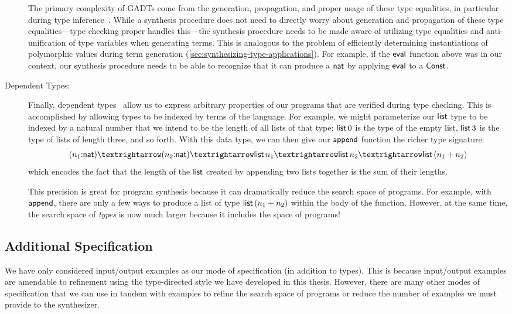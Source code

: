\begin{description}
    The primary complexity of GADTs come from the generation, propagation, and proper usage of these type equalities, in particular during type inference~\citep{peyton-jones-icfp-2006}.
    While a synthesis procedure does not need to directly worry about generation and propagation of these type equalities---type checking proper handles this---the synthesis procedure needs to be made aware of utilizing type equalities and anti-unification of type variables when generating terms.
    This is analogous to the problem of efficiently determining instantiations of polymorphic values during term generation (\autoref{sec:synthesizing-type-applications}).
    For example, if the $\mathsf{eval}$ function above was in our context, our synthesis procedure needs to be able to recognize that it can produce a $\mathsf{nat}$ by applying $\mathsf{eval}$ to a $\mathsf{Const}$.
  \item[Dependent Types:]
    Finally, dependent types~\citep{martin-lof-1984} allow us to express arbitrary properties of our programs that are verified during type checking.
    This is accomplished by allowing types to be indexed by terms of the language.
    For example, we might parameterize our $\mathsf{list}$ type to be indexed by a natural number that we intend to be the length of all lists of that type: $\mathsf{list}\,0$ is the type of the empty list, $\mathsf{list}\,3$ is the type of lists of length three, and so forth.
    With this data type, we can then give our $\mathsf{append}$ function the richer type signature:
    \[
      (n_1{:}\mnat) → (n_2{:}\mnat) → \mkwd{list}\,n_1 → \mkwd{list}\,n_2 → \mkwd{list}\,(n_1 + n_2)
    \]
    which encodes the fact that the length of the $\mathsf{list}$ created by appending two lists together is the sum of their lengths.

    This precision is great for program synthesis because it can dramatically reduce the search space of programs.
    For example, with $\mathsf{append}$, there are only a few ways to produce a list of type $\mathsf{list}\,(n_1 + n_2)$ within the body of the function.
    However, at the same time, the search space of \emph{types} is now much larger because it includes the space of programs!
\end{description}

\subsection{Additional Specification}
\label{subsec:additional-specification}

We have only considered input/output examples as our mode of specification (in addition to types).
This is because input/output examples are amendable to refinement using the type-directed style we have developed in this thesis.
However, there are many other modes of specification that we can use in tandem with examples to refine the search space of programs or reduce the number of examples we must provide to the synthesizer.

